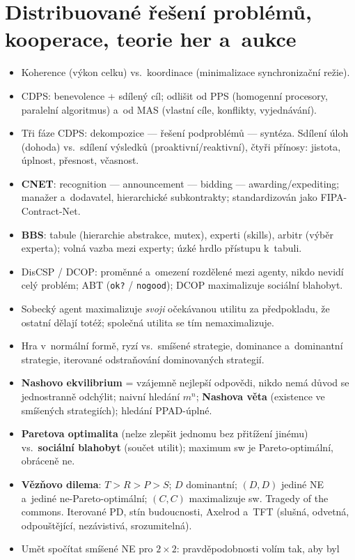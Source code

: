 \documentclass[11pt,a4paper]{article}
\theoremstyle{definition}
\begin{document}
\section{Distribuované řešení problémů, kooperace, teorie her a~aukce}
\begin{itemize}
\item Koherence (výkon celku) vs.\ koordinace (minimalizace synchronizační režie).
\item CDPS: benevolence + sdílený cíl; odlišit od PPS (homogenní procesory, paralelní algoritmus)
 a~od MAS (vlastní cíle, konflikty, vyjednávání).
\item Tři fáze CDPS: dekompozice --- řešení podproblémů --- syntéza. Sdílení úloh (dohoda)
 vs.\ sdílení výsledků (proaktivní/reaktivní), čtyři přínosy: jistota, úplnost, přesnost,
 včasnost.
\item \textbf{CNET}: recognition --- announcement --- bidding --- awarding/expediting; manažer
 a~dodavatel, hierarchické subkontrakty; standardizován jako FIPA-Contract-Net.
\item \textbf{BBS}: tabule (hierarchie abstrakce, mutex), experti (skills), arbitr (výběr
 experta); volná vazba mezi experty; úzké hrdlo přístupu k~tabuli.
\item DisCSP / DCOP: proměnné a~omezení rozdělené mezi agenty, nikdo nevidí celý problém;
 ABT (\texttt{ok?} / \texttt{nogood}); DCOP maximalizuje sociální blahobyt.
\item Sobecký agent maximalizuje \emph{svoji} očekávanou utilitu za předpokladu, že ostatní
 dělají totéž; společná utilita se tím nemaximalizuje.
\item Hra v~normální formě, ryzí vs.\ smíšené strategie, dominance a~dominantní strategie,
 iterované odstraňování dominovaných strategií.
\item \textbf{Nashovo ekvilibrium} = vzájemně nejlepší odpovědi, nikdo nemá důvod se
 jednostranně odchýlit; naivní hledání $m^n$; \textbf{Nashova věta} (existence ve smíšených
 strategiích); hledání PPAD-úplné.
\item \textbf{Paretova optimalita} (nelze zlepšit jednomu bez přitížení jinému)
 vs.\ \textbf{sociální blahobyt} (součet utilit); maximum sw je Pareto-optimální, obráceně ne.
\item \textbf{Vězňovo dilema}: $T>R>P>S$; $D$ dominantní; $(D,D)$ jediné NE a~jediné
 ne-Pareto-optimální; $(C,C)$ maximalizuje sw. Tragedy of the commons.
 Iterované PD, stín budoucnosti, Axelrod a~TFT (slušná, odvetná, odpouštějící, nezávistivá,
 srozumitelná).
\item Umět spočítat smíšené NE pro $2\times2$: pravděpodobnosti volím tak, aby byl

\end{itemize}
\end{document}
